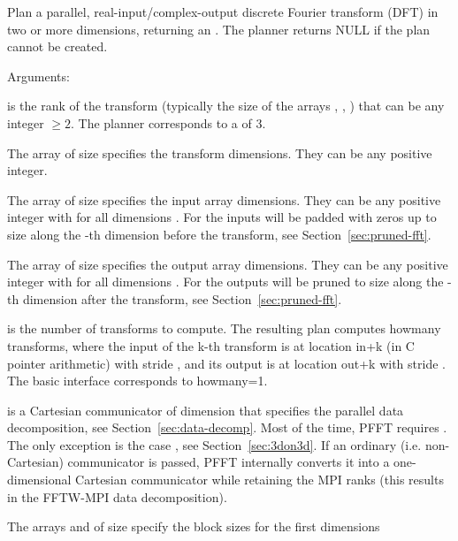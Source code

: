 Plan a parallel, real-input/complex-output discrete Fourier transform (DFT) in two or more dimensions, returning an .
The planner returns NULL if the plan cannot be created.

Arguments:
\begin{compactitem}
  \item {} is the rank of the transform (typically the size of the arrays , , ) that can be any integer $\ge 2$.
        The  planner corresponds to a  of 3.
  \item The array  of size  specifies the transform dimensions. They can be any positive integer.
  \item The array  of size  specifies the input array dimensions.
        They can be any positive integer with  for all dimensions .
        For  the inputs will be padded with zeros up to size  along the -th dimension before the transform, see Section~\ref{sec:pruned-fft}.
  \item The array  of size  specifies the output array dimensions.
        They can be any positive integer with  for all dimensions .
        For  the outputs will be pruned to size  along the -th dimension after the transform, see Section~\ref{sec:pruned-fft}.
  \item {} is the number of transforms to compute. The resulting plan computes howmany transforms, 
        where the input of the k-th transform is at location in+k (in C pointer arithmetic) with stride ,
        and its output is at location out+k with stride .
        The basic  interface corresponds to howmany=1.
  \item {} is a Cartesian communicator of dimension  that specifies the parallel data decomposition, see Section~\ref{sec:data-decomp}.
        Most of the time, PFFT requires . The only exception is the case , see Section~\ref{sec:3don3d}.
        If an ordinary (i.e. non-Cartesian) communicator is passed, PFFT internally converts it into a one-dimensional Cartesian communicator while retaining the MPI ranks
        (this results in the FFTW-MPI data decomposition).
  \item The arrays  and  of size  specify the block sizes for the first  dimensions 

\end{compactitem}
